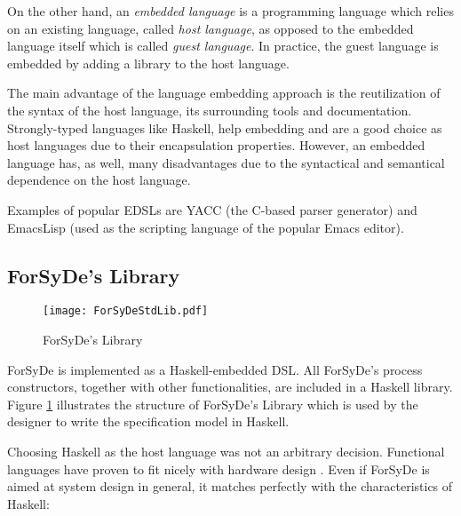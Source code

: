 On the other hand, an \textit{embedded language} is a programming
language which relies on an existing language, called \textit{host
  language}, as opposed to the embedded language itself which is
called \textit{guest language}. In practice, the guest language is
embedded by adding a library to the host language.

The main advantage of the language embedding approach is the
reutilization of the syntax of the host language, its
surrounding tools and documentation. Strongly-typed languages like
Haskell, help embedding and are a good choice as host languages due to
their encapsulation properties. However, an embedded language has, as
well, many disadvantages due to the syntactical and semantical
dependence on the host language.

Examples of popular EDSLs are YACC (the C-based parser generator) and
EmacsLisp (used as the scripting language of the popular Emacs editor).

\subsection{ForSyDe's Library}
\begin{figure}
\centering
\texttt{[image: ForSyDeStdLib.pdf]}
  \caption{ForSyDe's Library}
  \label{fig:forlib}
\end{figure}

ForSyDe is implemented as a Haskell-embedded DSL. All ForSyDe's
process constructors, together with other functionalities, are included
in a Haskell library.  Figure \ref{fig:forlib} illustrates the
structure of ForSyDe's Library which is used by the designer to write
the specification model in Haskell.

Choosing Haskell as the host language was not an arbitrary decision.
Functional languages have proven to fit nicely with hardware
design \cite{funhw}. Even if ForSyDe is aimed at system design in
general, it matches perfectly with the characteristics of Haskell:

